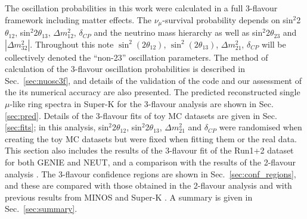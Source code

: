 The oscillation probabilities in this work were calculated in a full 3-flavour framework including matter effects. 
The $\nu_{\mu}$-survival probability depends on sin$^{2}$2$\theta_{12}$, sin$^{2}$2$\theta_{13}$, $\Delta m^{2}_{12}$, $\delta_{CP}$ 
and the neutrino mass hierarchy as well as sin$^{2}$2$\theta_{23}$ and $|\Delta m^{2}_{32}|$. Throughout this note $\sin^{2}(2 \theta_{12})$, 
$\sin^{2}(2 \theta_{13})$, $\Delta m_{21}^{2}$, $\delta_{CP}$ will be collectively denoted the ``non-23'' oscillation parameters. The method of 
calculation of the 3-flavour oscillation probabilities is described in Sec.\ \ref{sec:nuosc3f}, and details of the validation of the code and our 
assessment of the its numerical accuracy are also presented. The predicted reconstructed single $\mu$-like ring spectra in 
Super-K for the 3-flavour analysis are shown in Sec. \ref{sec:pred}. Details of the 3-flavour fits of toy MC datasets are given in 
Sec. \ref{sec:fits}; in this analysis, sin$^{2}$2$\theta_{12}$, sin$^{2}$2$\theta_{13}$, $\Delta m^{2}_{21}$ and $\delta_{CP}$ were 
randomised when creating the toy MC datasets but were fixed when fitting them or the real data. This section also includes the results of the 3-flavour 
fit of the Run1+2 dataset for both GENIE and NEUT, and a comparison with the results of the 2-flavour analysis \cite{OurRun1and2Analysis2F}. 
The 3-flavour confidence regions are shown in Sec.\ \ref{sec:conf_regions}, and these are compared with those obtained 
in the 2-flavour analysis \cite{OurRun1and2Analysis2F} and with previous results from MINOS \cite{Minos2011} and Super-K \cite{OldDisappSuperK}. 
A summary is given in Sec.\ \ref{sec:summary}.  

